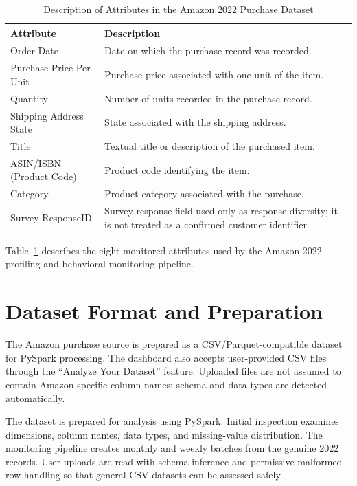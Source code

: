 \documentclass[12pt,a4paper]{report}
\begin{document}
\begin{table}[H]
\centering

\renewcommand{\arraystretch}{1.15}
\begin{tabular}{|p{3.0cm}|p{9.5cm}|}
\hline
\textbf{Attribute} & \textbf{Description}\\
\hline
Order Date & Date on which the purchase record was recorded.\\
\hline
Purchase Price Per Unit & Purchase price associated with one unit of the item.\\
\hline
Quantity & Number of units recorded in the purchase record.\\
\hline
Shipping Address State & State associated with the shipping address.\\
\hline
Title & Textual title or description of the purchased item.\\
\hline
ASIN/ISBN (Product Code) & Product code identifying the item.\\
\hline
Category & Product category associated with the purchase.\\
\hline
Survey ResponseID & Survey-response field used only as response diversity; it is not treated as a confirmed customer identifier.\\
\hline
\end{tabular}
\caption{Description of Attributes in the Amazon 2022 Purchase Dataset}
\label{tab:amazon_attributes}
\end{table}

Table~\ref{tab:amazon_attributes} describes the eight monitored attributes used by the Amazon 2022 profiling and behavioral-monitoring pipeline.




\section{Dataset Format and Preparation}

The Amazon purchase source is prepared as a CSV/Parquet-compatible dataset for PySpark processing. The dashboard also accepts user-provided CSV files through the ``Analyze Your Dataset'' feature. Uploaded files are not assumed to contain Amazon-specific column names; schema and data types are detected automatically.

The dataset is prepared for analysis using PySpark. Initial inspection examines dimensions, column names, data types, and missing-value distribution. The monitoring pipeline creates monthly and weekly batches from the genuine 2022 records. User uploads are read with schema inference and permissive malformed-row handling so that general CSV datasets can be assessed safely.
\end{document}
